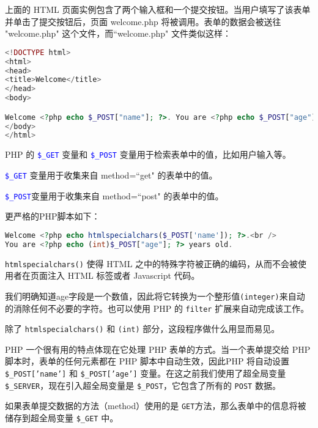 上面的 HTML 页面实例包含了两个输入框和一个提交按钮。当用户填写了该表单并单击了提交按钮后，页面 welcome.php 将被调用。表单的数据会被送往 "welcome.php" 这个文件，而``welcome.php" 文件类似这样：

\begin{lstlisting}[language=PHP]
<!DOCTYPE html>
<html>
<head>
<title>Welcome</title>
</head>
<body>

Welcome <?php echo $_POST["name"]; ?>. You are <?php echo $_POST["age"]; ?> years old.
</body>
</html>
\end{lstlisting}

PHP 的 \textcolor{Blue}{\texttt{\$\_GET}} 变量和 \textcolor{Blue}{\texttt{\$\_POST}} 变量用于检索表单中的值，比如用户输入等。

\begin{compactitem}
\item \textcolor{Blue}{\texttt{\$\_GET}} 变量用于收集来自 method=``get" 的表单中的值。
\item \textcolor{Blue}{\texttt{\$\_POST}}变量用于收集来自 method=``post" 的表单中的值。
\end{compactitem}

更严格的PHP脚本如下：

\begin{lstlisting}[language=PHP]
Welcome <?php echo htmlspecialchars($_POST['name']); ?>.<br />
You are <?php echo (int)$_POST["age"]; ?> years old.
\end{lstlisting}


\texttt{htmlspecialchars()} 使得 HTML 之中的特殊字符被正确的编码，从而不会被使用者在页面注入 HTML 标签或者 Javascript 代码。



我们明确知道age字段是一个数值，因此将它转换为一个整形值\texttt{(integer)}来自动的消除任何不必要的字符。也可以使用 PHP 的 \texttt{filter} 扩展来自动完成该工作。

除了 \texttt{htmlspecialchars()} 和 \texttt{(int)} 部分，这段程序做什么用显而易见。

PHP 一个很有用的特点体现在它处理 PHP 表单的方式。当一个表单提交给 PHP 脚本时，表单的任何元素都在 PHP 脚本中自动生效，因此PHP 将自动设置 \texttt{\$\_POST['name']} 和 \texttt{\$\_POST['age']} 变量。在这之前我们使用了超全局变量 \texttt{\$\_SERVER}，现在引入超全局变量是 \texttt{\$\_POST}，它包含了所有的 \texttt{POST} 数据。

如果表单提交数据的方法（method）使用的是 \texttt{GET}方法，那么表单中的信息将被储存到超全局变量 \texttt{\$\_GET} 中。

